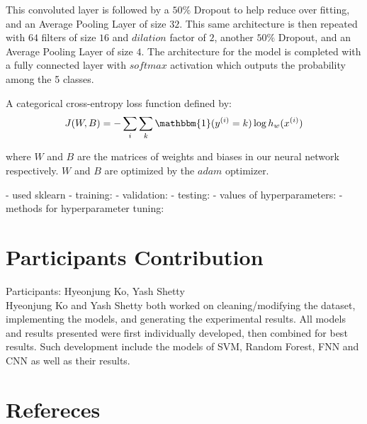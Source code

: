 \documentclass[11.5pt]{article}
\begin{document}
This convoluted layer is followed by a $50\%$ Dropout to help reduce over fitting, and an Average Pooling Layer of size $32$. This same architecture is then repeated with $64$ filters of size $16$ and $dilation$ factor of $2$, another $50\%$ Dropout, and an Average Pooling Layer of size $4$. The architecture for the model is completed with a fully connected layer with $softmax$ activation which outputs the probability among the 5 classes.

A categorical cross-entropy loss function defined by:
\[J(W, B) = -\sum_{i}\sum_{k} \mathbbm{1} (y^{(i)} = k) \log h_{w}(x^{(i)})\]
 
 where $W$ and $B$ are the matrices of weights and biases in our neural network respectively. $W$ and $B$ are optimized by the $adam$ optimizer.

 
- used sklearn
- training:
- validation:
- testing:
- values of hyperparameters:
- methods for hyperparameter tuning:
​
​
\section{Participants Contribution}
Participants: Hyeonjung Ko, Yash Shetty\\
​
Hyeonjung Ko and Yash Shetty both worked on cleaning/modifying the dataset, implementing the models, and generating the experimental results. All models and results presented were first individually developed, then combined for best results. Such development include the models of SVM, Random Forest, FNN and CNN as well as their results.
​
\section{Refereces}

​
​
​
\vspace{10mm}
​
\end{document}
